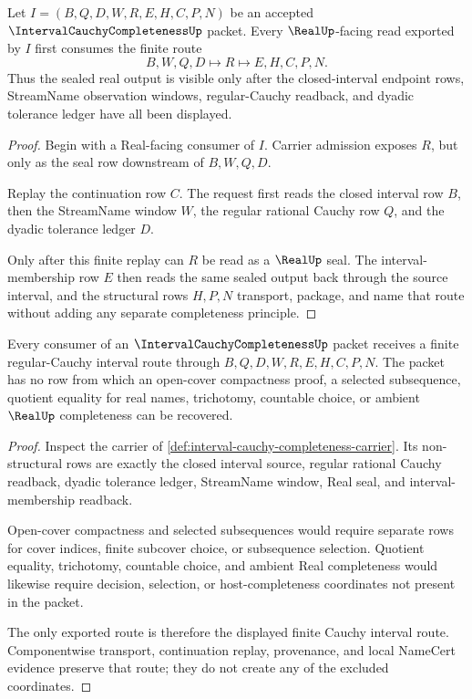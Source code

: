 \begin{theorem}
\label{thm:interval-cauchy-completeness-regular-seal}
Let $I=(B,Q,D,W,R,E,H,C,P,N)$ be an accepted $\IntervalCauchyCompletenessUp$ packet. Every $\RealUp$-facing read exported by $I$ first consumes the finite route
$$
B,W,Q,D \longmapsto R \longmapsto E,H,C,P,N .
$$
Thus the sealed real output is visible only after the closed-interval endpoint rows, StreamName observation windows, regular-Cauchy readback, and dyadic tolerance ledger have all been displayed.
\end{theorem}
\begin{proof}
Begin with a Real-facing consumer of $I$. Carrier admission exposes $R$, but only as the seal row downstream of $B,W,Q,D$.

Replay the continuation row $C$. The request first reads the closed interval row $B$, then the StreamName window $W$, the regular rational Cauchy row $Q$, and the dyadic tolerance ledger $D$.

Only after this finite replay can $R$ be read as a $\RealUp$ seal. The interval-membership row $E$ then reads the same sealed output back through the source interval, and the structural rows $H,P,N$ transport, package, and name that route without adding any separate completeness principle.
\end{proof}

\begin{theorem}
\label{thm:interval-cauchy-completeness-no-open-cover}
Every consumer of an $\IntervalCauchyCompletenessUp$ packet receives a finite regular-Cauchy interval route through $B,Q,D,W,R,E,H,C,P,N$. The packet has no row from which an open-cover compactness proof, a selected subsequence, quotient equality for real names, trichotomy, countable choice, or ambient $\RealUp$ completeness can be recovered.
\end{theorem}
\begin{proof}
Inspect the carrier of \autoref{def:interval-cauchy-completeness-carrier}. Its non-structural rows are exactly the closed interval source, regular rational Cauchy readback, dyadic tolerance ledger, StreamName window, Real seal, and interval-membership readback.

Open-cover compactness and selected subsequences would require separate rows for cover indices, finite subcover choice, or subsequence selection. Quotient equality, trichotomy, countable choice, and ambient Real completeness would likewise require decision, selection, or host-completeness coordinates not present in the packet.

The only exported route is therefore the displayed finite Cauchy interval route. Componentwise transport, continuation replay, provenance, and local NameCert evidence preserve that route; they do not create any of the excluded coordinates.
\end{proof}

